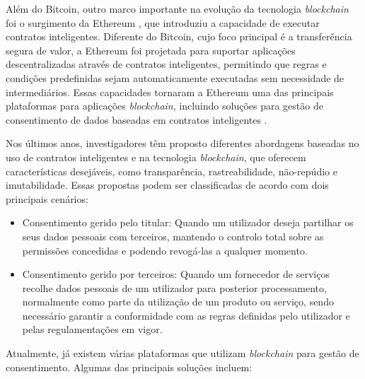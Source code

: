 Além do Bitcoin, outro marco importante na evolução da tecnologia \textit{blockchain} foi o surgimento da Ethereum \citep{buterin2014next}, que introduziu a capacidade de executar contratos inteligentes. Diferente do Bitcoin, cujo foco principal é a transferência segura de valor, a Ethereum foi projetada para suportar aplicações descentralizadas através de contratos inteligentes, permitindo que regras e condições predefinidas sejam automaticamente executadas sem necessidade de intermediários. Essas capacidades tornaram a Ethereum uma das principais plataformas para aplicações \textit{blockchain}, incluindo soluções para gestão de consentimento de dados baseadas em contratos inteligentes \citep{Frank2018}.

Nos últimos anos, investigadores têm proposto diferentes abordagens baseadas no uso de contratos inteligentes e na tecnologia \textit{blockchain}, que oferecem características desejáveis, como transparência, rastreabilidade, não-repúdio e imutabilidade. Essas propostas podem ser classificadas de acordo com dois principais cenários:

\begin{itemize}
    \item Consentimento gerido pelo titular: Quando um utilizador deseja partilhar os seus dados pessoais com terceiros, mantendo o controlo total sobre as permissões concedidas e podendo revogá-las a qualquer momento.
    \item Consentimento gerido por terceiros: Quando um fornecedor de serviços recolhe dados pessoais de um utilizador para posterior processamento, normalmente como parte da utilização de um produto ou serviço, sendo necessário garantir a conformidade com as regras definidas pelo utilizador e pelas regulamentações em vigor.
\end{itemize}

Atualmente, já existem várias plataformas que utilizam \textit{blockchain} para gestão de consentimento. 
Algumas das principais soluções incluem:

